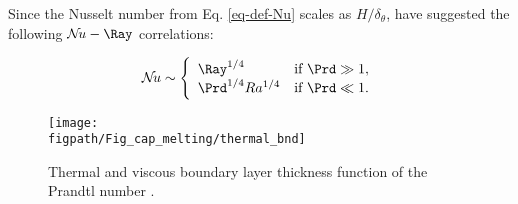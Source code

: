 \noindent Since the Nusselt number from Eq. \eqref{eq-def-Nu} scales as $H/\delta_\theta$, \cite{bejan2013convection} have suggested the following $\mathcal{N}\!u - \Ray$ correlations:

\begin{equation} \label{eq-Nu}
   \mathcal{N}\!u \sim \left\{
   \begin{array}{ll}
   \Ray^{1/4} &	 \mbox{if }  \Prd \gg 1,\\
   \Prd^{1/4} Ra^{1/4} &   \mbox{if } \Prd \ll 1.
   \end{array}
   \right.
\end{equation}

\begin{figure}
	\begin{center}
		\texttt{[image: \\figpath/Fig\_cap\_melting/thermal\_bnd]}
	\end{center}
	\caption{Thermal and viscous boundary layer thickness function of the Prandtl number \citep{bejan2013convection}.}
	\label{fig:min-size-bnd}
\end{figure}

